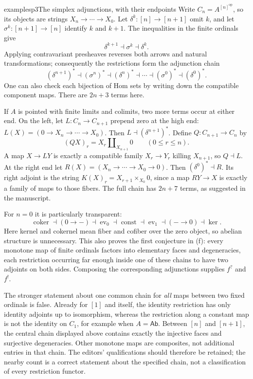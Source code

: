 \begin{dcomment}{examples}{p3}{The simplex adjunctions, with their endpoints}
Write $C_n=A^{[n]^{\mathrm{op}}}$, so its objects are strings $X_n\to\cdots\to X_0$. Let $\delta^k:[n]\to[n+1]$ omit $k$, and let $\sigma^k:[n+1]\to[n]$ identify $k$ and $k+1$. The inequalities in the finite ordinals give
\[
 \delta^{k+1}\dashv\sigma^k\dashv\delta^k.
\]
Applying contravariant presheaves reverses both arrows and natural transformations; consequently the restrictions form the adjunction chain
\[
 (\delta^{n+1})^*\dashv(\sigma^n)^*\dashv
 (\delta^n)^*\dashv\cdots\dashv
 (\sigma^0)^*\dashv(\delta^0)^*.
\]
One can also check each bijection of Hom sets by writing down the compatible component maps. There are $2n+3$ terms here.

If $A$ is pointed with finite limits and colimits, two more terms occur at either end. On the left, let $L:C_n\to C_{n+1}$ prepend zero at the high end: $L(X)=(0\to X_n\to\cdots\to X_0)$. Then $L\dashv(\delta^{n+1})^*$. Define $Q:C_{n+1}\to C_n$ by
\[
 (QX)_r=X_r\amalg_{X_{n+1}}0\qquad(0\leq r\leq n).
\]
A map $X\to LY$ is exactly a compatible family $X_r\to Y_r$ killing $X_{n+1}$, so $Q\dashv L$. At the right end let $R(X)=(X_n\to\cdots\to X_0\to0)$. Then $(\delta^0)^*\dashv R$. Its right adjoint is the string $K(X)_r=X_{r+1}\times_{X_0}0$, since a map $RY\to X$ is exactly a family of maps to those fibers. The full chain has $2n+7$ terms, as suggested in the manuscript.

For $n=0$ it is particularly transparent:
\[
 \operatorname{coker}\dashv(0\to-)\dashv
 \operatorname{ev}_0\dashv\operatorname{const}\dashv
 \operatorname{ev}_1\dashv(-\to0)\dashv\operatorname{ker}.
\]
Here kernel and cokernel mean fiber and cofiber over the zero object, so abelian structure is unnecessary. This also proves the first conjecture in (f): every monotone map of finite ordinals factors into elementary faces and degeneracies, each restriction occurring far enough inside one of these chains to have two adjoints on both sides. Composing the corresponding adjunctions supplies $f^?$ and $f^!$.

The stronger statement about one common chain for \emph{all} maps between two fixed ordinals is false. Already for $[1]$ and itself, the identity restriction has only identity adjoints up to isomorphism, whereas the restriction along a constant map is not the identity on $C_1$, for example when $A=\mathsf{Ab}$. Between $[n]$ and $[n+1]$, the central chain displayed above contains exactly the injective faces and surjective degeneracies. Other monotone maps are composites, not additional entries in that chain. The editors' qualifications should therefore be retained; the nearby count is a correct statement about the specified chain, not a classification of every restriction functor.
\end{dcomment}


